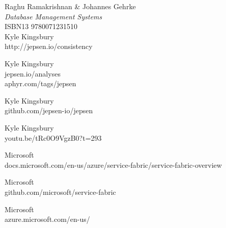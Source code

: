 \documentclass[a4paper,10pt,titlepage]{report}
\begin{document}
\begin{thebibliography}{9}
Raghu Ramakrishnan \& Johannes Gehrke  \\
\textit{Database Management Systems} \\
ISBN13 9780071231510\\

Kyle Kingsbury\\
http://jepsen.io/consistency

Kyle Kingsbury\\
jepsen.io/analyses \\
aphyr.com/tags/jepsen 

Kyle Kingsbury\\
github.com/jepsen-io/jepsen 

Kyle Kingsbury\\
youtu.be/tRc0O9VgzB0?t=293

Microsoft\\
docs.microsoft.com/en-us/azure/service-fabric/service-fabric-overview  

Microsoft\\
github.com/microsoft/service-fabric  

Microsoft \\
azure.microsoft.com/en-us/

\end{thebibliography}
\end{document}
